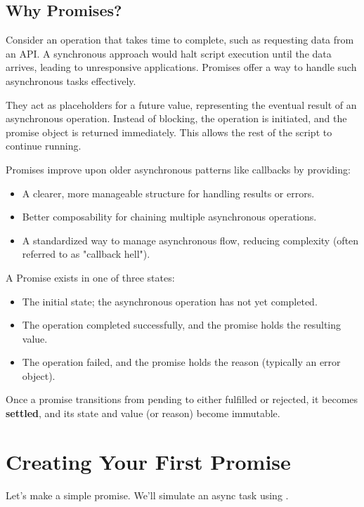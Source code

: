 \subsection{Why Promises?}

Consider an operation that takes time to complete, such as requesting data from an API. A synchronous approach would halt script execution until the data arrives, leading to unresponsive applications. Promises offer a way to handle such asynchronous tasks effectively.

They act as placeholders for a future value, representing the eventual result of an asynchronous operation. Instead of blocking, the operation is initiated, and the promise object is returned immediately. This allows the rest of the script to continue running.

Promises improve upon older asynchronous patterns like callbacks by providing:

\begin{itemize}
    \item A clearer, more manageable structure for handling results or errors.
    \item Better composability for chaining multiple asynchronous operations.
    \item A standardized way to manage asynchronous flow, reducing complexity (often referred to as "callback hell").
\end{itemize}

A Promise exists in one of three states:
\begin{itemize}
    \item {} The initial state; the asynchronous operation has not yet completed.
    \item {} The operation completed successfully, and the promise holds the resulting value.
    \item {} The operation failed, and the promise holds the reason (typically an error object).
\end{itemize}

Once a promise transitions from pending to either fulfilled or rejected, it becomes \textbf{settled}, and its state and value (or reason) become immutable.

\section{Creating Your First Promise}

Let's make a simple promise. We'll simulate an async task using .

